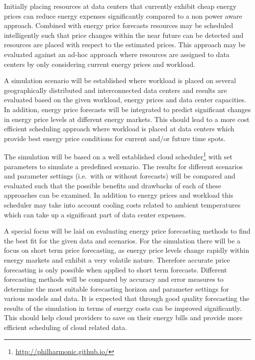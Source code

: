 Initially placing resources at data centers that currently exhibit cheap energy prices can reduce energy expenses significantly compared to a non power aware approach. Combined with energy price forecasts resources may be scheduled intelligently such that price changes within the near future can be detected and resources are placed with respect to the estimated prices. This approach may be evaluated against an ad-hoc approach where resources are assigned to data centers by only considering current energy prices and workload. 

A simulation scenario will be established where workload is placed on several geographically distributed and interconnected data centers and results are evaluated based on the given workload, energy prices and data center capacities. In addition, energy price forecasts will be integrated to predict significant changes in energy price levels at different energy markets. This should lead to a more cost efficient scheduling approach where workload is placed at data centers which provide best energy price conditions for current and/or future time spots. 

The simulation will be based on a well established cloud scheduler\footnote{\url{http://philharmonic.github.io/}} with set parameters to simulate a predefined scenario. The results for different scenarios and parameter settings (i.e.~with or without forecasts) will be compared and evaluated such that the possible benefits and drawbacks of each of these approaches can be examined. 
In addition to energy prices and workload this scheduler may take into account cooling costs related to ambient temperatures which can take up a significant part of data center expenses. 

A special focus will be laid on evaluating energy price forecasting methods to find the best fit for the given data and scenarios. For the simulation there will be a focus on short term price forecasting, as energy price levels change rapidly within energy markets and exhibit a very volatile nature. Therefore accurate price forecasting is only possible when applied to short term forecasts. 
Different forecasting methods will be compared by accuracy and error measures to determine the most suitable forecasting horizon and parameter settings for various models and data. It is expected that through good quality forecasting the results of the simulation in terms of energy costs can be improved significantly. This should help cloud providers to save on their energy bills and provide more efficient scheduling of cloud related data. 

